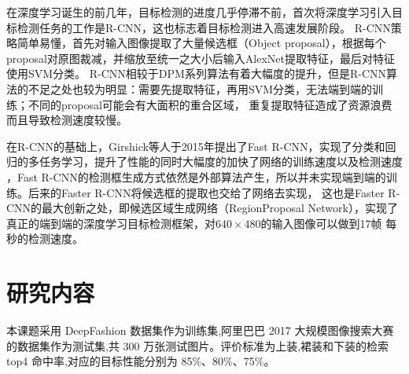 在深度学习诞生的前几年，目标检测的进度几乎停滞不前，首次将深度学习引入目标检测任务的工作是R-CNN\cite{girshick2014rich}，这也标志着目标检测进入高速发展阶段。
R-CNN策略简单易懂，首先对输入图像提取了大量候选框（Object proposal），根据每个proposal对原图裁减，并缩放至统一之大小后输入AlexNet提取特征，最后对特征使用SVM分类。
R-CNN相较于DPM系列算法有着大幅度的提升，但是R-CNN算法的不足之处也较为明显：需要先提取特征，再用SVM分类，无法端到端的训练；不同的proposal可能会有大面积的重合区域，
重复提取特征造成了资源浪费而且导致检测速度较慢。


在R-CNN的基础上，Girshick等人于2015年提出了Fast R-CNN\cite{girshick2015fast}，实现了分类和回归的多任务学习，提升了性能的同时大幅度的加快了网络的训练速度以及检测速度
，Fast R-CNN的检测框生成方式依然是外部算法产生，所以并未实现端到端的训练。后来的Faster R-CNN\cite{ren2015faster}将候选框的提取也交给了网络去实现，
这也是Faster R-CNN的最大创新之处，即候选区域生成网络（RegionProposal Network），实现了真正的端到端的深度学习目标检测框架，对$640 \times 480$的输入图像可以做到17帧
每秒的检测速度。


\section{研究内容}
本课题采用 DeepFashion\cite{liu2016deepfashion} 数据集作为训练集,阿里巴巴 2017 大规模图像搜索大赛
的数据集作为测试集,共 300 万张测试图片。评价标准为上装,裙装和下装的检索 top4
命中率,对应的目标性能分别为 85\%、80\%、75\%。

